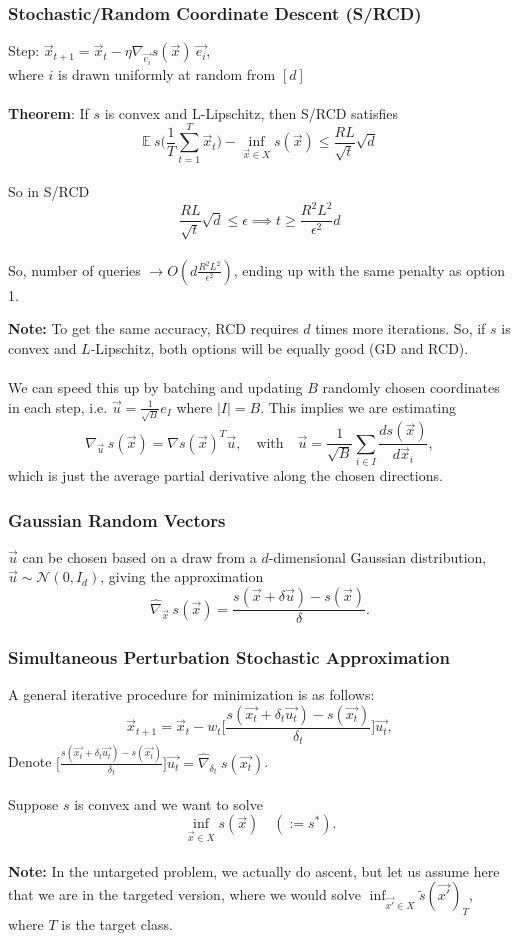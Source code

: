\documentclass[11pt]{report}
\begin{document}
\subsubsection*{Stochastic/Random Coordinate Descent (S/RCD)}
Step: $\vec{x}_{t+1} = \vec{x}_t - \eta \nabla_{\vec{e_i}} s(\vec{x}) \: \vec{e_i}$, \\ where $i$ is drawn uniformly at random from $[d]$ 
\\
\\
\textbf{Theorem}: If $s$ is convex and L-Lipschitz, then S/RCD satisfies 
\[
    \mathbb{E} \: s\Big(\frac{1}{T}\sum_{t=1}^T \vec{x}_t\Big) - \inf_{\vec{x} \in X} s(\vec{x}) \leq \frac{RL}{\sqrt{t}}\sqrt{d}
\]
\\
So in S/RCD
\[
    \frac{RL}{\sqrt{t}}\sqrt{d} \leq \epsilon \implies t \geq \frac{R^2L^2}{\epsilon^2} d
\]
\\
So, number of queries $\xrightarrow{} O(d\frac{R^2L^2}{\epsilon^2})$, ending up with the same penalty as option 1.

\noindent
\textbf{Note:} To get the same accuracy, RCD requires $d$ times more iterations. So, if $s$ is convex and $L$-Lipschitz, both options will be equally good (GD and RCD).
\\
\\
We can speed this up by batching and updating $B$ randomly chosen coordinates in each step, i.e. $\vec{u} = \frac{1}{\sqrt{B}}e_I$ where $\lvert I \rvert = B$. 
This implies we are estimating
\[
    \nabla_{\vec{u}} \: s(\vec{x}) = \nabla s(\vec{x})^T \vec{u}, \quad \text{with} \quad \vec{u} = \frac{1}{\sqrt{B}} \sum_{i \in I} \frac{ds(\vec{x})}{d\vec{x}_i},
\]
which is just the average partial derivative along the chosen directions.
\subsubsection*{Gaussian Random Vectors}
$\vec{u}$ can be chosen based on a draw from a $d$-dimensional Gaussian distribution, $\vec{u} \sim \mathcal{N}(0, I_d)$, giving the approximation
\[
    \widehat{\nabla}_{\vec{x}} \: s(\vec{x}) = \frac{s(\vec{x} + \delta \vec{u}) - s(\vec{x})}{\delta} .
\]
\subsubsection*{Simultaneous Perturbation Stochastic Approximation}
A general iterative procedure for minimization is as follows:
\begin{equation}
    \vec{x}_{t+1} = \vec{x}_t - w_t \Big[ \frac{s(\vec{x_t} + \delta_t \vec{u_t}) - s(\vec{x_t})}{\delta_t} \Big] \vec{u_t},
\end{equation}
Denote $\Big[\frac{s(\vec{x_t} + \delta_t \vec{u_t}) - s(\vec{x_t})}{\delta_t}\Big] \vec{u_t} = \widehat{\nabla}_{\delta_t} \: s(\vec{x_t})$.
\\
\\
Suppose $s$ is convex and we want to solve
\[
    \inf_{\vec{x} \in X} s(\vec{x}) \quad (:= s^*).
\]
\\
\textbf{Note:} In the untargeted problem, we actually do ascent, but let us assume here that we are in the targeted version, where we would solve $\inf_{\vec{x'} \in X} \tilde{s}(\vec{x'})_T$, where $T$ is the target class.
\end{document}
